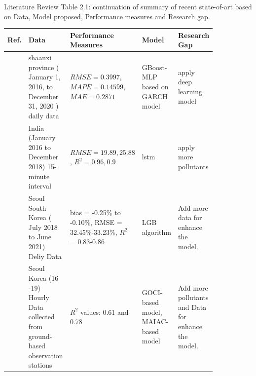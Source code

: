 \documentclass[12pt, aspectratio=169]{beamer}
\begin{document}
\begin{frame}{Literature Review}
	\centering
	\scriptsize {Table 2.1: continuation of summary of recent state-of-art based on Data,  Model proposed,  Performance measures and Research gap.}\\
	\begin{table}
		\centering
		\begin{tabular}{|p{0.03\linewidth}|p{0.29\linewidth}|p{0.15\linewidth}|p{0.16\linewidth}|p{0.21\linewidth}|}
			\hline
			\footnotesize \textbf {Ref.} & \footnotesize \textbf { Data} & \footnotesize \textbf {Performance Measures } & \footnotesize \textbf {Model} & \footnotesize \textbf {Research Gap }  \\ \hline
			\scriptsize \cite{DAI2022131898} \scriptsize &shaanxi province ( January 1,  2016, to December 31,  2020 ) daily data \scriptsize & $RMSE=0.3997$, $MAPE=0.14599$, $MAE=0.2871$ \scriptsize &GBoost-MLP based on GARCH model \scriptsize & apply deep learning model \\  \hline
 			\scriptsize \cite{AGGARWAL2021129660} \scriptsize & India (January 2016 to December 2018) 15-minute interval  \scriptsize & $RMSE=19.89, 25.88$ ,  $R^2=0.96, 0.9$ \scriptsize &lstm\scriptsize &apply more pollutants \\\hline
			 \scriptsize \cite{kim2022short}         \scriptsize & Seoul South Korea ( July 2018 to   June 2021) Deliy Data                                                 \scriptsize & bias = -0.25\% to -0.10\%,  RMSE =   32.45\%-33.23\%,  $R^2$ = 0.83-0.86                                     \scriptsize & LGB algorithm                                                       \scriptsize & Add more data for enhance the model.                                                                            \\ \hline
			 \scriptsize \cite{lee2021potential}            \scriptsize & Seoul Korea (16 -19) Hourly Data collected from ground-based observation stations                      \scriptsize & $R^2$ values:  0.61 and 0.78                                                                                \scriptsize & GOCI-based model, MAIAC-based model                                \scriptsize & Add more pollutants and Data for enhance the model.                                                                   \\ \hline
		\end{tabular}
	\end{table}
\end{frame}
\end{document}

